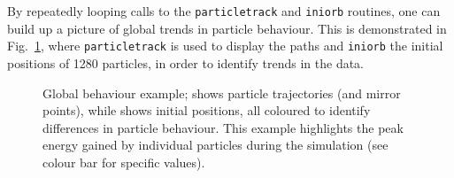 \documentclass[a4paper,11pt,usenames,dvipsnames]{article}
\begin{document}
By repeatedly looping calls to the \texttt{particletrack} and \texttt{iniorb} routines, one can build up a picture of global trends in particle behaviour. This is demonstrated in Fig.~\ref{fig:ptexample}, where \texttt{particletrack} is used to display the paths and \texttt{iniorb} the initial positions of 1280 particles, in order to identify trends in the data.
\begin{figure}[th]
 \centering
 \caption{Global behaviour example; \protect{} shows particle trajectories (and mirror points), while \protect{} shows initial positions, all coloured to identify differences in particle behaviour. This example highlights the peak energy gained by individual particles during the simulation (see colour bar for specific values).}
 \label{fig:ptexample}
\end{figure}
\end{document}
